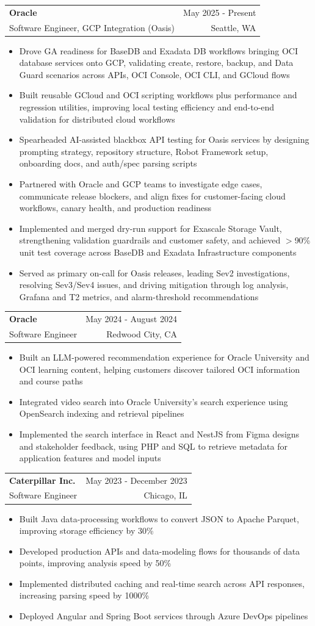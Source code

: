 \documentclass[letterpaper,11pt]{article}
\makeatletter
\newcommand{\resumeItem}[1]{
  \item\small{
    {#1 \vspace{-2pt}}
  }
}
\newcommand{\resumeSubheading}[4]{
  \vspace{-2pt}\item
    \begin{tabular*}{0.97\textwidth}[t]{l@{\extracolsep{\fill}}r}
      \textbf{#1} & #2 \\
      {\small#3} & {\small #4} \\
    \end{tabular*}\vspace{-7pt}
}
\newcommand{\resumeItemListStart}{\begin{itemize}}
\newcommand{\resumeItemListEnd}{\end{itemize}\vspace{-5pt}}
\makeatother
\begin{document}
    \resumeSubheading
  {Oracle}{May 2025 - Present}
  {Software Engineer, GCP Integration (Oasis)}{Seattle, WA}
  \resumeItemListStart
    \resumeItem{Drove GA readiness for BaseDB and Exadata DB workflows bringing OCI database services onto GCP, validating create, restore, backup, and Data Guard scenarios across APIs, OCI Console, OCI CLI, and GCloud flows}
    \resumeItem{Built reusable GCloud and OCI scripting workflows plus performance and regression utilities, improving local testing efficiency and end-to-end validation for distributed cloud workflows}
    \resumeItem{Spearheaded AI-assisted blackbox API testing for Oasis services by designing prompting strategy, repository structure, Robot Framework setup, onboarding docs, and auth/spec parsing scripts}
    \resumeItem{Partnered with Oracle and GCP teams to investigate edge cases, communicate release blockers, and align fixes for customer-facing cloud workflows, canary health, and production readiness}
    \resumeItem{Implemented and merged dry-run support for Exascale Storage Vault, strengthening validation guardrails and customer safety, and achieved $>$90\% unit test coverage across BaseDB and Exadata Infrastructure components}
    \resumeItem{Served as primary on-call for Oasis releases, leading Sev2 investigations, resolving Sev3/Sev4 issues, and driving mitigation through log analysis, Grafana and T2 metrics, and alarm-threshold recommendations}
  \resumeItemListEnd

    \resumeSubheading
      {Oracle}{May 2024 - August 2024}
      {Software Engineer}{Redwood City, CA}
      \resumeItemListStart
        \resumeItem{Built an LLM-powered recommendation experience for Oracle University and OCI learning content, helping customers discover tailored OCI information and course paths}
        \resumeItem{Integrated video search into Oracle University's search experience using OpenSearch indexing and retrieval pipelines}
        \resumeItem{Implemented the search interface in React and NestJS from Figma designs and stakeholder feedback, using PHP and SQL to retrieve metadata for application features and model inputs}
      \resumeItemListEnd

    \resumeSubheading
      {Caterpillar Inc.}{May 2023 - December 2023}
      {Software Engineer}{Chicago, IL}
      \resumeItemListStart
        \resumeItem{Built Java data-processing workflows to convert JSON to Apache Parquet, improving storage efficiency by 30\%}
        \resumeItem{Developed production APIs and data-modeling flows for thousands of data points, improving analysis speed by 50\%}
        \resumeItem{Implemented distributed caching and real-time search across API responses, increasing parsing speed by 1000\%}
        \resumeItem{Deployed Angular and Spring Boot services through Azure DevOps pipelines}
      \resumeItemListEnd
\end{document}
